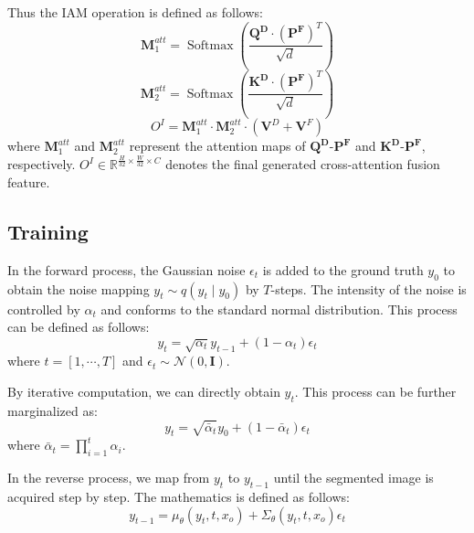 \documentclass{ecai}
\begin{document}
Thus the IAM operation is defined as follows:
\begin{equation}
    \mathbf{M}^{att}_{1}=\operatorname{Softmax}\left(\frac{ \mathbf{Q^{D}} \cdot ( \mathbf{P^{F}})^{T} }{\sqrt{d}}\right)
\end{equation}
\begin{equation}
    \mathbf{M}^{att}_{2}=\operatorname{Softmax}\left(\frac{ \mathbf{K^{D}} \cdot (\mathbf{P^{F}})^{T} }{\sqrt{d}}\right)
\end{equation}
\begin{equation}
    O^{I} = \mathbf{M}^{att}_{1} \cdot \mathbf{M}^{att}_{2} \cdot (\mathbf{V}^{D} + \mathbf{V}^{F})
\end{equation}
where $\mathbf{M}^{att}_{1}$ and $\mathbf{M}^{att}_{2}$ represent the attention maps of $\mathbf{Q^{D}}$-$\mathbf{P^{F}}$ and $\mathbf{K^{D}}$-$\mathbf{P^{F}}$, respectively. $O^{I} \in \mathbb{R}^{\frac{H}{32} \times \frac{W}{32} \times C}$ denotes the final generated cross-attention fusion feature.



\subsection{Training}
\label{training}
In the forward process, the Gaussian noise $\epsilon_{t}$ is added to the ground truth $y_{0}$ to obtain the noise mapping ${y}_t \sim q\left({y}_t \mid {y}_0\right)$ by $T$-steps. The intensity of the noise is controlled by $\alpha_{t}$ and conforms to the standard normal distribution. This process can be defined as follows:
\begin{equation}
    y_{t}=\sqrt{\alpha_{t}} y_{t-1}+\left(1-\alpha_{t}\right) \epsilon_{t}
\end{equation}
where $t=[1, \cdots, T]$ and $\epsilon_{t} \sim \mathcal{N}(0, \mathbf{I})$. 

By iterative computation, we can directly obtain $y_{t}$. This process can be further marginalized as:
\begin{equation}
    y_{t}=\sqrt{\bar{\alpha}_{t}} y_{0}+\left(1-\bar{\alpha}_{t}\right) \epsilon_{t}
\end{equation}
where $\bar{\alpha}_t=\prod_{i=1}^t \alpha_i$. 

In the reverse process, we map from $y_{t}$ to $y_{t-1}$ until the segmented image is acquired step by step. The mathematics is defined as follows:
\begin{equation}
    \label{Equation_reverse}
    y_{t-1}=\mu_\theta\left(y_t, t, x_{o}\right)+\Sigma_\theta\left(y_t, t, x_{o}\right) \epsilon_t
\end{equation}
\end{document}
